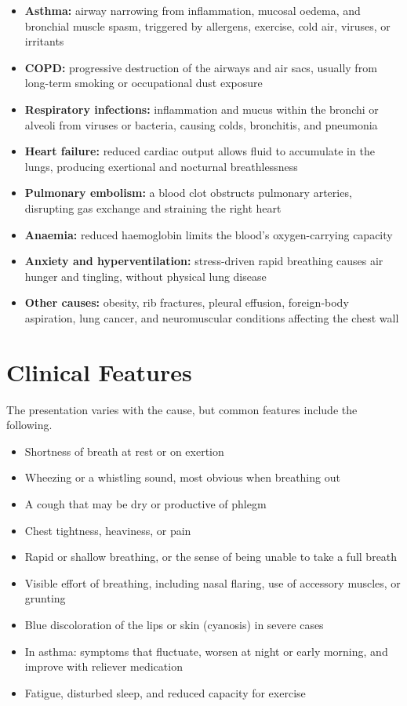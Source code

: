 \begin{itemize}
    \item \textbf{Asthma:} airway narrowing from inflammation, mucosal oedema, and bronchial muscle spasm, triggered by allergens, exercise, cold air, viruses, or irritants
    \item \textbf{COPD:} progressive destruction of the airways and air sacs, usually from long-term smoking or occupational dust exposure
    \item \textbf{Respiratory infections:} inflammation and mucus within the bronchi or alveoli from viruses or bacteria, causing colds, bronchitis, and pneumonia
    \item \textbf{Heart failure:} reduced cardiac output allows fluid to accumulate in the lungs, producing exertional and nocturnal breathlessness
    \item \textbf{Pulmonary embolism:} a blood clot obstructs pulmonary arteries, disrupting gas exchange and straining the right heart
    \item \textbf{Anaemia:} reduced haemoglobin limits the blood's oxygen-carrying capacity
    \item \textbf{Anxiety and hyperventilation:} stress-driven rapid breathing causes air hunger and tingling, without physical lung disease
    \item \textbf{Other causes:} obesity, rib fractures, pleural effusion, foreign-body aspiration, lung cancer, and neuromuscular conditions affecting the chest wall
\end{itemize}

\section*{Clinical Features}
The presentation varies with the cause, but common features include the following.

\begin{itemize}
    \item Shortness of breath at rest or on exertion
    \item Wheezing or a whistling sound, most obvious when breathing out
    \item A cough that may be dry or productive of phlegm
    \item Chest tightness, heaviness, or pain
    \item Rapid or shallow breathing, or the sense of being unable to take a full breath
    \item Visible effort of breathing, including nasal flaring, use of accessory muscles, or grunting
    \item Blue discoloration of the lips or skin (cyanosis) in severe cases
    \item In asthma: symptoms that fluctuate, worsen at night or early morning, and improve with reliever medication
    \item Fatigue, disturbed sleep, and reduced capacity for exercise
\end{itemize}

